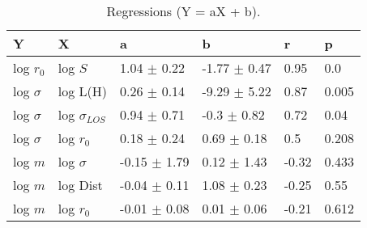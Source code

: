 \begin{table}
\centering
\caption{Regressions (Y = aX + b).}
\begin{tabular}{llllll}
\toprule
            Y &                   X &                 a &                 b &      r &      p \\
\midrule
    log $r_0$ &             log $S$ &   1.04 $\pm$ 0.22 &  -1.77 $\pm$ 0.47 &   0.95 &    0.0 \\
 log $\sigma$ &            log L(H) &   0.26 $\pm$ 0.14 &  -9.29 $\pm$ 5.22 &   0.87 &  0.005 \\
 log $\sigma$ &  log $\sigma_{LOS}$ &   0.94 $\pm$ 0.71 &   -0.3 $\pm$ 0.82 &   0.72 &   0.04 \\
 log $\sigma$ &         log $r_{0}$ &   0.18 $\pm$ 0.24 &   0.69 $\pm$ 0.18 &    0.5 &  0.208 \\
      log $m$ &        log $\sigma$ &  -0.15 $\pm$ 1.79 &   0.12 $\pm$ 1.43 &  -0.32 &  0.433 \\
      log $m$ &            log Dist &  -0.04 $\pm$ 0.11 &   1.08 $\pm$ 0.23 &  -0.25 &   0.55 \\
      log $m$ &         log $r_{0}$ &  -0.01 $\pm$ 0.08 &   0.01 $\pm$ 0.06 &  -0.21 &  0.612 \\
\bottomrule
\end{tabular}
\end{table}
